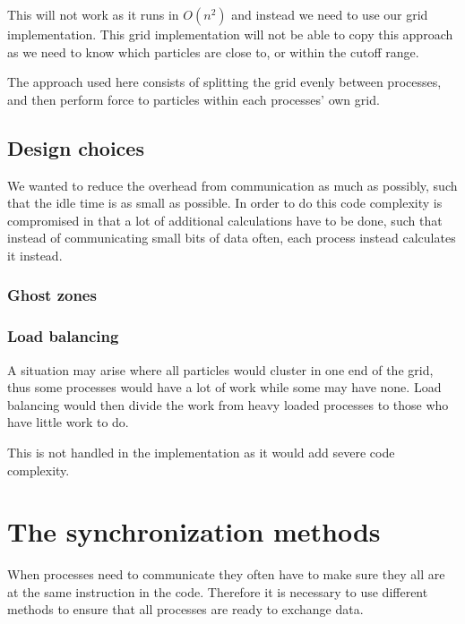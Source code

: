 \documentclass[a4paper,11pt,oneside]{book}
\begin{document}
This will not work as it runs in $O(n^{2})$ and instead we need to use our grid implementation. This grid implementation
will not be able to copy this approach as we need to know which particles are close to, or within the cutoff range.

The approach used here consists of splitting the grid evenly between processes, and then perform force to particles
within each processes' own grid.

\subsection{Design choices}

We wanted to reduce the overhead from communication as much as possibly, such that the idle time is as small as
possible. In order to do this code complexity is compromised in that a lot of additional calculations have to be done,
such that instead of communicating small bits of data often, each process instead calculates it instead.

\subsubsection{Ghost zones}


\subsubsection{Load balancing}

A situation may arise where all particles would cluster in one end of the grid, thus some processes would have a lot of
work while some may have none. Load balancing would then divide the work from heavy loaded processes to those who have
little work to do.

This is not handled in the implementation as it would add severe code complexity.

\section{The synchronization methods}

When processes need to communicate they often have to make sure they all are at the same instruction in the code.
Therefore it is necessary to use different methods  to ensure that all processes are ready to exchange data.
\end{document}
